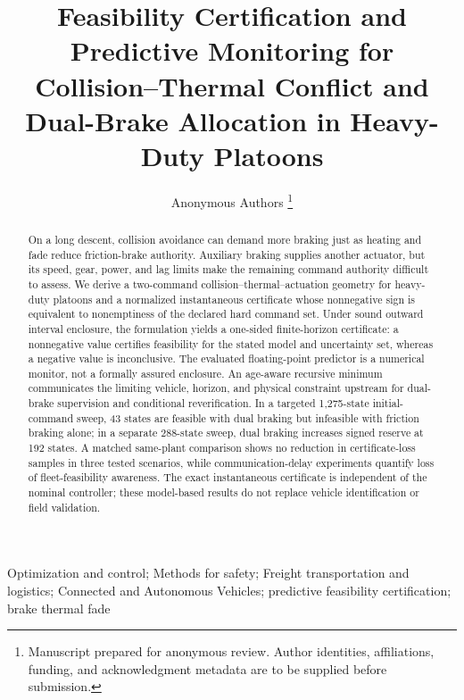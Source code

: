 \documentclass[journal]{../template/IEEEtran}
\title{Feasibility Certification and Predictive Monitoring for Collision--Thermal Conflict and Dual-Brake Allocation in Heavy-Duty Platoons}
\author{Anonymous Authors%
\thanks{Manuscript prepared for anonymous review. Author identities, affiliations, funding, and acknowledgment metadata are to be supplied before submission.}}
\begin{document}
\maketitle

\begin{abstract}
On a long descent, collision avoidance can demand more braking just as heating and fade reduce friction-brake authority. Auxiliary braking supplies another actuator, but its speed, gear, power, and lag limits make the remaining command authority difficult to assess. We derive a two-command collision--thermal--actuation geometry for heavy-duty platoons and a normalized instantaneous certificate whose nonnegative sign is equivalent to nonemptiness of the declared hard command set. Under sound outward interval enclosure, the formulation yields a one-sided finite-horizon certificate: a nonnegative value certifies feasibility for the stated model and uncertainty set, whereas a negative value is inconclusive. The evaluated floating-point predictor is a numerical monitor, not a formally assured enclosure. An age-aware recursive minimum communicates the limiting vehicle, horizon, and physical constraint upstream for dual-brake supervision and conditional reverification. In a targeted 1,275-state initial-command sweep, 43 states are feasible with dual braking but infeasible with friction braking alone; in a separate 288-state sweep, dual braking increases signed reserve at 192 states. A matched same-plant comparison shows no reduction in certificate-loss samples in three tested scenarios, while communication-delay experiments quantify loss of fleet-feasibility awareness. The exact instantaneous certificate is independent of the nominal controller; these model-based results do not replace vehicle identification or field validation.
\end{abstract}

\begin{IEEEkeywords}
Optimization and control; Methods for safety; Freight transportation and logistics; Connected and Autonomous Vehicles; predictive feasibility certification; brake thermal fade
\end{IEEEkeywords}














\end{document}
